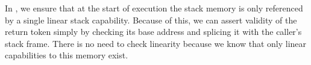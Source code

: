 \documentclass[acmsmall,review,showframe]{acmart}\settopmatter{printfolios=true,printccs=false,printacmref=false}
\begin{document}

In \stktokens{}, we ensure that at the start of execution the stack memory is only referenced by a single linear stack capability.
Because of this, we can assert validity of the return token simply by checking its base address and splicing it with the caller's stack frame.
There is no need to check linearity because we know that only linear capabilities to this memory exist.
\end{document}
